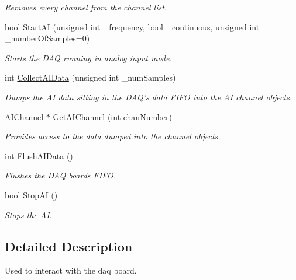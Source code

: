 \begin{DoxyCompactItemize}
\begin{DoxyCompactList}\small\item\em Removes every channel from the channel list. \end{DoxyCompactList}\item 
bool \hyperlink{class_picto_1_1_picto_box_daq_board_a8f68342594594baf25a8ea97af2e3e57}{Start\-A\-I} (unsigned int \-\_\-frequency, bool \-\_\-continuous, unsigned int \-\_\-number\-Of\-Samples=0)
\begin{DoxyCompactList}\small\item\em Starts the D\-A\-Q running in analog input mode. \end{DoxyCompactList}\item 
int \hyperlink{class_picto_1_1_picto_box_daq_board_a247f804e58e19eb6dff066a7bf2c923d}{Collect\-A\-I\-Data} (unsigned int \-\_\-num\-Samples)
\begin{DoxyCompactList}\small\item\em Dumps the A\-I data sitting in the D\-A\-Q's data F\-I\-F\-O into the A\-I channel objects. \end{DoxyCompactList}\item 
\hyperlink{class_picto_1_1_picto_box_daq_board_ab68067ef89b37aa5f57c9c0c433a941f}{A\-I\-Channel} $\ast$ \hyperlink{class_picto_1_1_picto_box_daq_board_ab3d4c01d7b422fc0dbcd44167f303cbf}{Get\-A\-I\-Channel} (int chan\-Number)
\begin{DoxyCompactList}\small\item\em Provides access to the data dumped into the channel objects. \end{DoxyCompactList}\item 
int \hyperlink{class_picto_1_1_picto_box_daq_board_acee0ae907bad4f942ae7df144c428911}{Flush\-A\-I\-Data} ()
\begin{DoxyCompactList}\small\item\em Flushes the D\-A\-Q boards F\-I\-F\-O. \end{DoxyCompactList}\item 
bool \hyperlink{class_picto_1_1_picto_box_daq_board_abf0d0627692239110029133459cca43f}{Stop\-A\-I} ()
\begin{DoxyCompactList}\small\item\em Stops the A\-I. \end{DoxyCompactList}\end{DoxyCompactItemize}


\subsection{Detailed Description}
Used to interact with the daq board. 

